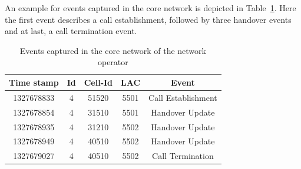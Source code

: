 An example for events captured in the core network is depicted in Table~\ref{table:events}. Here the first event describes a call establishment, followed by three handover events and at last, a call termination event. \newline
\begin{table}[h]
		\caption{Events captured in the core network of the network operator}
		\begin{tabular}{|c|c|c|c|c|}
			\hline
			Time stamp & Id & Cell-Id & LAC  & Event              \\ \hline
			1327678833 & 4  & 51520   & 5501 & Call Establishment \\
			1327678854 & 4  & 31510   & 5501 & Handover Update    \\
			1327678935 & 4  & 31210   & 5502 & Handover Update    \\
			1327678949 & 4  & 40510   & 5502 & Handover Update    \\
			1327679027 & 4  & 40510   & 5502 & Call Termination   \\ \hline
		\end{tabular}
		\label{table:events}
\end{table}

%
%
%

